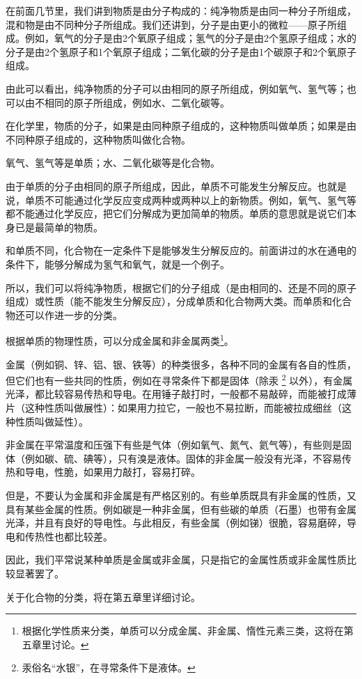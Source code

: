 在前面几节里，我们讲到物质是由分子构成的：纯净物质是由同一种分子所组成，混和物是由不同种分子所组成。我们还讲到，分子是由更小的微粒------原子所组成。例如，氧气的分子是由2个氧原子组成；氢气的分子是由2个氢原子组成；水的分子是由2个氢原子和1个氧原子组成；二氧化碳的分子是由1个碳原子和2个氧原子组成。

由此可以看出，纯净物质的分子可以由相同的原子所组成，例如氧气、氢气等；也可以由不相同的原子所组成，例如水、二氧化碳等。

在化学里，物质的分子，如果是由同种原子组成的，这种物质叫做单质；如果是由不同种原子组成的，这种物质叫做化合物。

氧气、氢气等是单质；水、二氧化碳等是化合物。

由于单质的分子由相同的原子所组成，因此，单质不可能发生分解反应。也就是说，单质不可能通过化学反应变成两种或两种以上的新物质。例如，氧气、氢气等都不能通过化学反应，把它们分解成为更加简单的物质。单质的意思就是说它们本身已是最简单的物质。

和单质不同，化合物在一定条件下是能够发生分解反应的。前面讲过的水在通电的条件下，能够分解成为氢气和氧气，就是一个例子。

所以，我们可以将纯净物质，根据它们的分子组成（是由相同的、还是不同的原子组成）或性质（能不能发生分解反应），分成单质和化合物两大类。而单质和化合物还可以作进一步的分类。

根据单质的物理性质，可以分成金属和非金属两类\footnote{根据化学性质来分类，单质可以分成金属、非金属、惰性元素三类，这将在第五章里讨论。}。

金属（例如铜、锌、铝、银、铁等）的种类很多，各种不同的金属有各自的性质，但它们也有一些共同的性质，例如在寻常条件下都是固体（除汞
\footnote{汞俗名``水银''，在寻常条件下是液体。}
以外），有金属光泽，都比较容易传热和导电。在用锤子敲打时，一般都不易敲碎，而能被打成薄片（这种性质叫做展性）：如果用力拉它，一般也不易拉断，而能被拉成细丝（这种性质叫做延性）。

非金属在平常温度和压强下有些是气体（例如氧气、氮气、氦气等），有些则是固体（例如碳、硫、碘等），只有溴是液体。固体的非金属一般没有光泽，不容易传热和导电，性脆，如果用力敲打，容易打碎。

但是，不要认为金属和非金属是有严格区别的。有些单质既具有非金属的性质，又具有某些金属的性质。例如碳是一种非金属，但有些碳的单质（石墨）也带有金属光泽，并且有良好的导电性。与此相反，有些金属（例如锑）很脆，容易磨碎，导电和传热性也都比较差。

因此，我们平常说某种单质是金属或非金属，只是指它的金属性质或非金属性质比较显著罢了。

关于化合物的分类，将在第五章里详细讨论。

